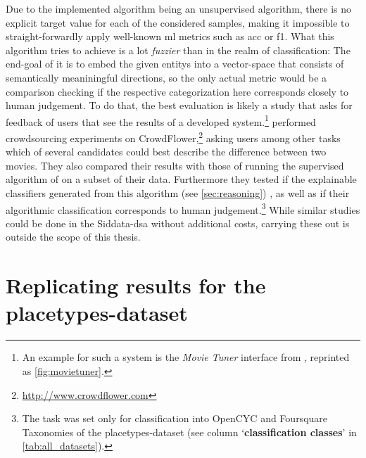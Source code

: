 Due to the implemented algorithm being an \gls{unsupervised} algorithm, there is no explicit target value for each of the considered samples, making it impossible to straight-forwardly apply well-known \gls{ml} metrics such as \Gls{acc} or \gls{f1}. What this algorithm tries to achieve is a lot \textit{fuzzier} than in the realm of classification: The end-goal of it is to embed the given \glspl{entity} into a vector-space that consists of semantically meaniningful directions, so the only actual metric would be a comparison checking if the respective categorization here corresponds closely to human judgement. To do that, the best evaluation is likely a study that asks for feedback of users that see the results of a developed system.\footnote{An example for such a system is the \textit{Movie Tuner} interface from \textcite{VISR12}, reprinted as \autoref{fig:movietuner}.} \textcite{Derrac2015} performed crowdsourcing experiments on CrowdFlower,\footnote{\url{http://www.crowdflower.com}} asking users among other tasks which of several candidates could best describe the difference between two movies. They also compared their results with those of running the supervised algorithm of \cite{VISR12} on a subset of their data. Furthermore they tested if the explainable classifiers generated from this algorithm (see \autoref{sec:reasoning})  \cite[48]{Derrac2015}, as well as if their algorithmic classification corresponds to human judgement.\footnote{The task was set only for classification into OpenCYC and Foursquare Taxonomies of the placetypes-dataset (see column `\textbf{classification classes}' in \autoref{tab:all_datasets}).} 
While similar studies could be done in the Siddata-\gls{dsa} \cite{Schurz2021} without additional costs, carrying these out is outside the scope of this thesis.



\section{Replicating results for the placetypes-dataset}
\label{sec:results_placetypes}

